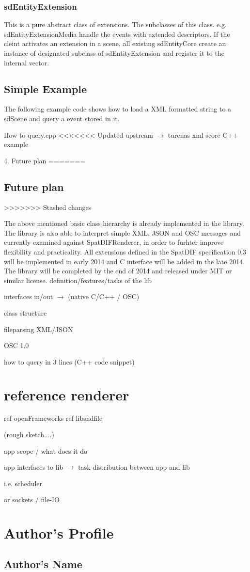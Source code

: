 \documentclass{article}
\begin{document}
\subsubsection{sdEntityExtension}
This is a pure abstract class of extensions. The subclasses of this class. e.g. sdEntityExtensionMedia handle the events with extended descriptors. If the cleint activates an extension in a scene, all existing sdEntityCore create an instance of designated subclass of sdEntityExtension and register it to the internal vector.

\subsection{Simple Example}
The following example code shows how to load a XML formatted string to a sdScene and query a event stored in it.

How to query.cpp
<<<<<<< Updated upstream
$\rightarrow$ turenas xml score C++ example


4. Future plan
=======


\subsection{Future plan}
>>>>>>> Stashed changes

The above mentioned basic class hierarchy is already implemented in the library. The library is also able to interpret simple XML, JSON and OSC messages and currently examined against SpatDIFRenderer, in order to furhter improve flexibility and practicality.  All extensions defined in the SpatDIF specification 0.3 will be implemented in early 2014 and C interface will be added in the late 2014. The library will be completed by the end of 2014 and released under MIT or similar license.
definition/features/tasks of the lib

interfaces in/out $\rightarrow$ (native C/C++ / OSC)

class structure

fileparsing XML/JSON

OSC 1.0

how to query in 3 lines (C++ code snippet)

\section{reference renderer }%


ref openFrameworks
ref libsndfile


(rough sketch....)

app scope / what does it do

app interfaces to lib $\rightarrow$ task distribution between app and lib

i.e. scheduler

or sockets / file-IO

\printbibliography


\section{Author's Profile}

\subsection*{Author's Name}
\end{document}
